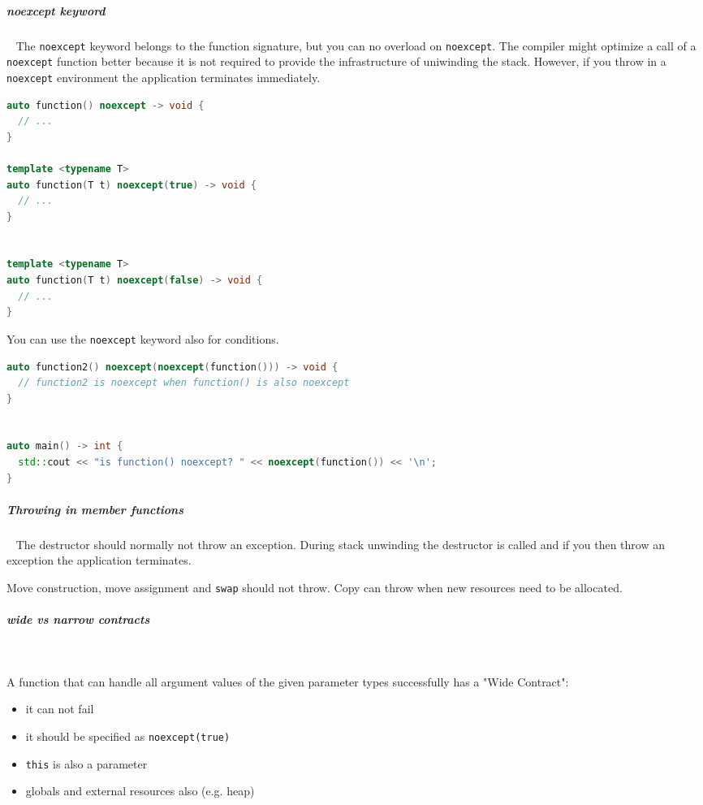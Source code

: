 \documentclass[11pt,twoside,landscape]{article}
\begin{document}
\begin{multicols}{2}
\subparagraph{noexcept keyword} \
\label{sec:orgf65f4d2}
The \texttt{noexcept} keyword belongs to the function signature, but you can no overload on \texttt{noexcept}.
The compiler might optimize a call of a \texttt{noexcept} function better because it is not required to provide the infrastructure of uniwinding the stack.
However, if you throw in a \texttt{noexcept} environment the application terminates immediately.


\begin{lstlisting}[language=c++,label=lst:org7d25b72,caption={Exaple for noexcept in signature},captionpos=b,numbers=none]
auto function() noexcept -> void {
  // ...
}

template <typename T>
auto function(T t) noexcept(true) -> void {
  // ...
}


template <typename T>
auto function(T t) noexcept(false) -> void {
  // ...
}
\end{lstlisting}

You can use the \texttt{noexcept} keyword also for conditions.

\begin{lstlisting}[language=c++,label=lst:orgdfb02db,caption={Example for conditional noexcept},captionpos=b,numbers=none]
auto function2() noexcept(noexcept(function())) -> void {
  // function2 is noexcept when function() is also noexcept
}


auto main() -> int {
  std::cout << "is function() noexcept? " << noexcept(function()) << '\n';
}
\end{lstlisting}

\subparagraph{Throwing in member functions} \
\label{sec:org3129c1f}
The destructor should normally not throw an exception.
During stack unwinding the destructor is called and if you then throw an exception the application terminates.

Move construction, move assignment and \texttt{swap} should not throw.
Copy can throw when new resources need to be allocated.

\subparagraph{wide vs narrow contracts} \
\label{sec:org67a172f}

A function that can handle all argument values of the given parameter types successfully has a "Wide Contract":
\begin{itemize}
\item it can not fail
\item it should be specified as \texttt{noexcept(true)}
\item \texttt{this} is also a parameter
\item globals and external resources also (e.g. heap)
\end{itemize}



\end{multicols}
\end{document}
